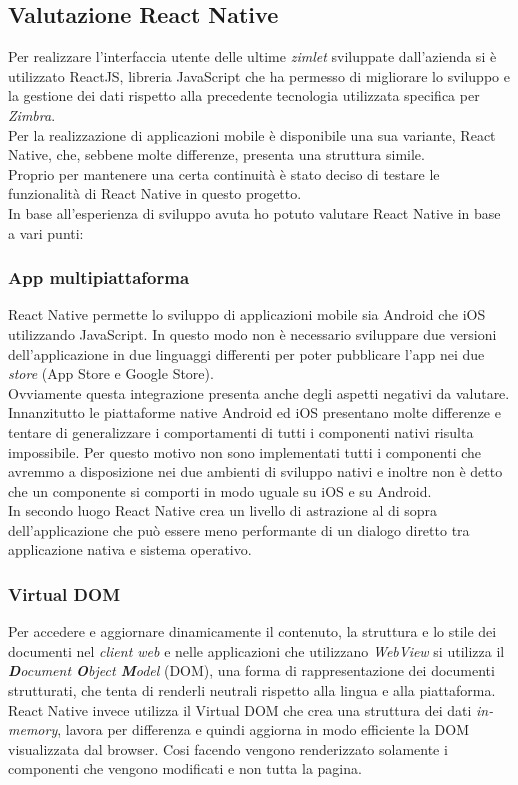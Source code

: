 \subsection{Valutazione React Native}
Per realizzare l'interfaccia utente delle ultime \emph{zimlet} sviluppate dall'azienda si è utilizzato ReactJS, libreria JavaScript che ha permesso di migliorare lo sviluppo e la gestione dei dati rispetto alla precedente tecnologia utilizzata specifica per \emph{Zimbra}. \\
Per la realizzazione di applicazioni mobile è disponibile una sua variante, React Native, che, sebbene molte differenze, presenta una struttura simile. \\
Proprio per mantenere una certa continuità è stato deciso di testare le funzionalità di React Native in questo progetto. \\
In base all'esperienza di sviluppo avuta ho potuto valutare React Native in base a vari punti:
\subsubsection{App multipiattaforma}
React Native permette lo sviluppo di applicazioni mobile sia Android che iOS utilizzando JavaScript. In questo modo non è necessario sviluppare due versioni dell'applicazione in due linguaggi differenti per poter pubblicare l'app nei due \emph{store} (App Store e Google Store). \\
Ovviamente questa integrazione presenta anche degli aspetti negativi da valutare. Innanzitutto le piattaforme native Android ed iOS presentano molte differenze e tentare di generalizzare i comportamenti di tutti i componenti nativi risulta impossibile. Per questo motivo non sono implementati tutti i componenti che avremmo a disposizione nei due ambienti di sviluppo nativi e inoltre non è detto che un componente si comporti in modo uguale su iOS e su Android. \\
In secondo luogo React Native crea un livello di astrazione al di sopra dell’applicazione che può essere meno performante di un dialogo diretto tra applicazione nativa e sistema operativo.
\subsubsection{Virtual DOM}
Per accedere e aggiornare dinamicamente il contenuto, la struttura e lo stile dei documenti nel \emph{client web} e nelle applicazioni che utilizzano \emph{WebView} si utilizza il \emph{\textbf{D}ocument \textbf{O}bject \textbf{M}odel} (\acrshort{DOM}), una forma di rappresentazione dei documenti strutturati, che tenta di renderli neutrali rispetto alla lingua e alla piattaforma. React Native invece utilizza il Virtual DOM che crea una struttura dei dati\emph{ in-memory}, lavora per differenza e quindi aggiorna in modo efficiente la DOM visualizzata dal browser. Cosi facendo vengono renderizzato solamente i componenti che vengono modificati e non tutta la pagina.
